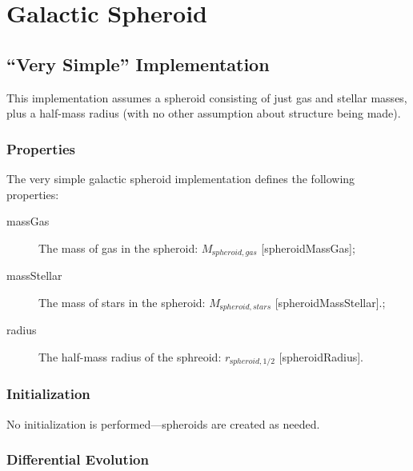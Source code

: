 \section{Galactic Spheroid}\label{sec:ComponentSpheroid}

\subsection{``Very Simple'' Implementation}

This implementation assumes a spheroid consisting of just gas and stellar masses, plus a half-mass radius (with no other assumption about structure being made).

\subsubsection{Properties}

The very simple galactic spheroid implementation defines the following properties:
\begin{description}
 \item [{\normalfont \ttfamily massGas}] The mass of gas in the spheroid: $M_{\mathrm spheroid, gas}$ [{\normalfont \ttfamily spheroidMassGas}];
 \item [{\normalfont \ttfamily massStellar}] The mass of stars in the spheroid: $M_{\mathrm spheroid, stars}$ [{\normalfont \ttfamily spheroidMassStellar}].;
 \item [{\normalfont \ttfamily radius}] The half-mass radius of the sphreoid: $r_{\mathrm spheroid, 1/2}$ [{\normalfont \ttfamily spheroidRadius}].
\end{description}

\subsubsection{Initialization}

No initialization is performed---spheroids are created as needed.

\subsubsection{Differential Evolution}

